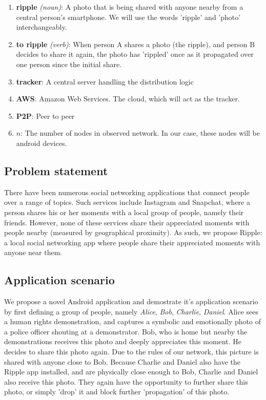 \documentclass{report}
\begin{document}
\begin{enumerate}
\item \textbf{ripple} \textit{(noun)}: A photo that is being shared with anyone nearby from a central person's smartphone. We will use the words 'ripple' and 'photo' interchangeably. 
\item \textbf{to ripple} \textit{(verb)}: When person A shares a photo (the ripple), and person B decides to share it again, the photo has 'rippled' once as it propagated over one person since the initial share.
\item \textbf{tracker}: A central server handling the distribution logic
\item \textbf{AWS}: Amazon Web Services. The cloud, which will act as the tracker.
\item \textbf{P2P}: Peer to peer
\item \textbf{$ n $}: The number of nodes in observed network. In our case, these nodes will be android devices.
\end{enumerate}

\subsection{Problem statement}
There have been numerous social networking applications that connect people over a range of topics. 
Such services include Instagram and Snapchat, where a person shares his or her moments with a local group of people, namely their friends. 
However, none of these services share their appreciated moments with people nearby (measured by geographical proximity). 
As such, we propose Ripple: a local social networking app where people share their appreciated moments with anyone near them.

\subsection{Application scenario}
We propose a novel Android application and demostrate it's application scenario by first defining a group of people, namely \textit{Alice}, \textit{Bob}, \textit{Charlie}, \textit{Daniel}.
Alice sees a human rights demonstration, and captures a symbolic and emotionally photo of a police officer shouting at a demonstrator. 
Bob, who is home but nearby the demonstrations  receives this photo and deeply appreciates this moment. 
He decides to share this photo again. Due to the rules of our network, this picture is shared with anyone close to Bob. Because Charlie and Daniel also have the Ripple app installed, and are physically close enough to Bob, Charlie and Daniel also receive this photo. They again have the opportunity to further share this photo, or simply 'drop' it and block further 'propagation' of this photo.
\end{document}
